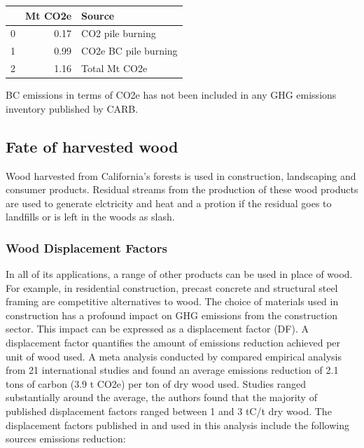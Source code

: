\documentclass[a4paper]{article}
\begin{document}
\begin{center}
\begin{tabular}{rrl}
 & Mt CO2e & Source\\
\hline
0 & 0.17 & CO2 pile burning\\
1 & 0.99 & CO2e BC pile burning\\
2 & 1.16 & Total Mt CO2e\\
\end{tabular}

\end{center}

BC emissions in terms of CO2e has not been included in any GHG emissions
inventory published by CARB.



\subsection{Fate of harvested wood}
\label{sec:orgheadline12}
Wood harvested from California's forests is used in construction,
landscaping and consumer products. Residual streams from the
production of these wood products are used to generate elctricity and
heat and a protion if the residual goes to landfills or is left in the
woods as slash.

\subsubsection{Wood Displacement Factors}
\label{sec:orgheadline5}

In all of its applications, a range of other products can be used in place of wood. For example, in
residential construction, precast concrete and structural steel framing
are competitive alternatives to wood. The choice of materials used in
construction has a profound impact on GHG emissions from the
construction sector. This impact can be expressed as a displacement
factor (DF). A displacement factor quantifies the amount of emissions
reduction achieved per unit of wood used. A meta analysis conducted by \citep{Sathre2010} compared empirical analysis from 21 international studies and found an
average emissions reduction of 2.1 tons of carbon (3.9 t CO2e) per ton
of dry wood used. Studies ranged substantially around the average, the
authors found that the majority of published displacement factors ranged
between 1 and 3 tC/t dry wood. The displacement factors published in
\citep{Sathre2010} and used in this analysis include the
following sources emissions reduction:
\end{document}
